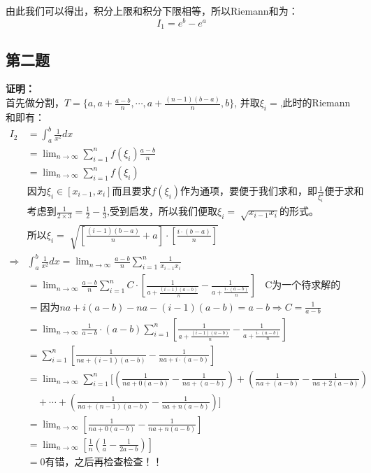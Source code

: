\documentclass[fontset=windows]{article}
\begin{document}
    由此我们可以得出，积分上限和积分下限相等，所以Riemann和为：
    \[
        I_1=e^b-e^a
    \]
    \subsection{第二题}
    \noindent\textbf{证明：}\\
    首先做分割，$T=\{a, a+\frac{a-b}{n}, \cdots, a+\frac{(n-1)(b-a)}{n}, b\}$, 并取$\xi_i=$,此时的Riemann和即有：\\
    \noindent
    $
        \begin{aligned}
            I_2&=\int_{a}^{b}{\frac{1}{x^2} dx}\nonumber\\
            &=\lim_{n\to\infty}{\sum_{i=1}^{n}{f(\xi_i)\frac{a-b}{n}}}\nonumber\\
            &=\lim_{n\to\infty}{\sum_{i=1}^{n}{f(\xi_i)}}\nonumber\\
            &\mbox{因为}\xi_i\in [x_{i-1}, x_i]\mbox{而且要求}f(\xi_i)\mbox{作为通项，要便于我们求和，即}\frac{1}{\xi_i^2}便于求和\nonumber\\
            &\mbox{考虑到}\frac{1}{2\times 3}=\frac{1}{2}-\frac{1}{3}\mbox{,受到启发，所以我们便取}\xi_i=\sqrt[]{x_{i-1}x_i}\mbox{的形式。}\nonumber\\
            &\mbox{所以}\xi_i=\sqrt[]{[\frac{(i-1)(b-a)}{n}+a]\cdot[\frac{i\cdot(b-a)}{n}]}\nonumber\\
            \Longrightarrow&\int_{a}^{b}{ \frac{1}{x^2}dx}=\lim_{n\to\infty}{\frac{a-b}{n}\sum_{i=1}^{n}{\frac{1}{x_{i-1}x_i}}}\nonumber\\
            &=\lim_{n\to\infty}{\frac{a-b}{n}\sum_{i=1}^{n}{C\cdot[\frac{1}{a+\frac{(i-1)(a-b)}{n}}-\frac{1}{a+\frac{i\cdot(a-b)}{n}}]}}~~~~\mbox{C为一个待求解的}\nonumber\\
            &=\mbox{因为} na+i(a-b)-na-(i-1)(a-b)=a-b\Longrightarrow C=\frac{1}{a-b}\nonumber\\
            &=\lim_{n\to\infty}{\frac{1}{a-b}\cdot (a-b)\sum_{i=1}^{n}{[\frac{1}{a+\frac{(i-1)(a-b)}{n}}-\frac{1}{a+\frac{i\cdot(a-b)}{n}}]}}\nonumber\\
            &=\sum_{i=1}^{n}{[\frac{1}{na+(i-1)(a-b)}-\frac{1}{na+i\cdot(a-b)}]}\nonumber\\
            &=\lim_{n\to\infty}\sum_{i=1}^{n}[(\frac{1}{na+0(a-b)}-\frac{1}{na+(a-b)})+(\frac{1}{na+(a-b)}-\frac{1}{na+2(a-b)})\nonumber\\
            &\quad+\cdots+(\frac{1}{na+(n-1)(a-b)}-\frac{1}{na+n(a-b)})]\nonumber\\
            &=\lim_{n\to\infty}{[\frac{1}{na+0(a-b)}-\frac{1}{na+n(a-b)}]}\nonumber\\
            &=\lim_{n\to\infty}{[\frac{1}{n}(\frac{1}{a}-\frac{1}{2a-b})]}\nonumber\\
            &=0\mbox{有错，之后再检查检查！！}
        \end{aligned}
    $   
\end{document}
